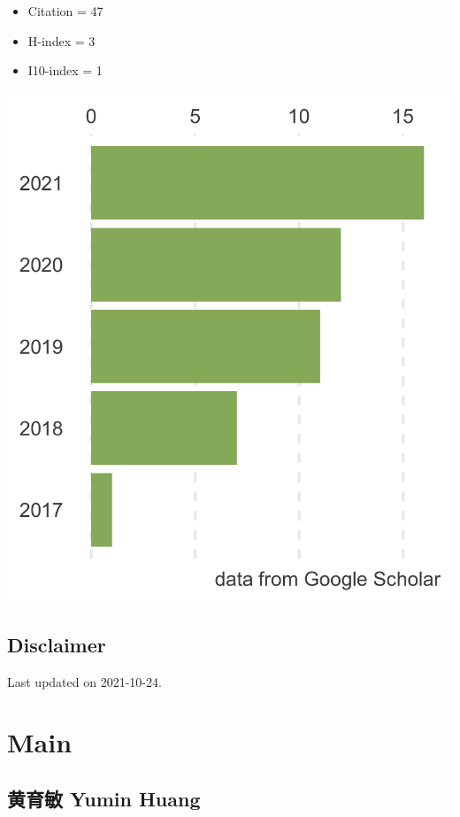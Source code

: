\documentclass[]{article}
\providecommand{\tightlist}{%
  \setlength{\itemsep}{0pt}\setlength{\parskip}{0pt}}
\begin{document}
\begin{itemize}
\tightlist
\item
  Citation = 47
\item
  H-index = 3
\item
  I10-index = 1
\end{itemize}

\includegraphics{citation.png}

\hypertarget{disclaimer}{%
\subsection{Disclaimer}\label{disclaimer}}

Last updated on 2021-10-24.

\hypertarget{main}{%
\section{Main}\label{main}}

\hypertarget{title}{%
\subsection{黄育敏 Yumin Huang}\label{title}}
\end{document}

